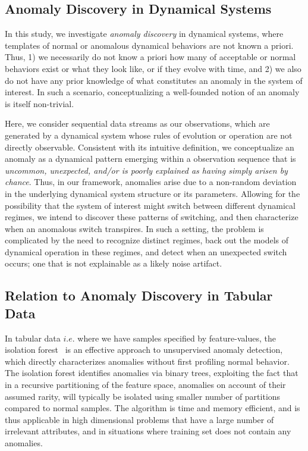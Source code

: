 \documentclass[9pt,journal]{IEEEtran}
\begin{document}
{\subsection{Anomaly Discovery in Dynamical Systems}
  In this study,  we investigate \textit{anomaly discovery} in dynamical systems, where  templates of normal or anomalous dynamical behaviors are not known a priori. Thus, 1) we necessarily do not know a priori  how many of acceptable or normal behaviors exist or what they look like, or if they evolve with time, and 2) we also do not have any prior knowledge of what constitutes an anomaly  in the system of interest. In such a scenario, conceptualizing a well-founded notion of an anomaly is itself non-trivial.

  Here, we consider sequential data streams as our observations, which are generated by a  dynamical system whose rules of evolution or operation are not directly observable. Consistent with its intuitive definition, we conceptualize an anomaly as a dynamical pattern emerging within   a observation sequence that is \textit{uncommon, unexpected, and/or is poorly explained as having simply arisen by chance}.
  Thus, in our framework, anomalies  arise due to a non-random  deviation in the   underlying dynamical system structure or its parameters. Allowing for the possibility that the system of interest might switch between different dynamical regimes, we intend to discover these patterns of switching, and then characterize when an anomalous switch transpires. In such a setting, the problem is  complicated by the need to recognize distinct regimes,  back out the models of dynamical operation in these regimes, and detect when an unexpected switch occurs; one that is not explainable as a likely noise artifact.

  \subsection{Relation to Anomaly Discovery in Tabular Data}
  In tabular data $i.e.$ where we have samples specified by feature-values, the isolation forest~\cite{liu2008isolation} is an effective approach to unsupervised anomaly detection, which directly characterizes anomalies  without first profiling normal behavior. The isolation forest  identifies anomalies via binary trees, exploiting the fact that in a recursive partitioning of the feature space, anomalies on account of their assumed rarity, will typically be isolated using smaller number of partitions compared to normal samples. The algorithm is  time and memory efficient, and is thus applicable  in high dimensional problems that have a large number of irrelevant attributes, and in situations where training set does not contain any anomalies.

}
\end{document}

